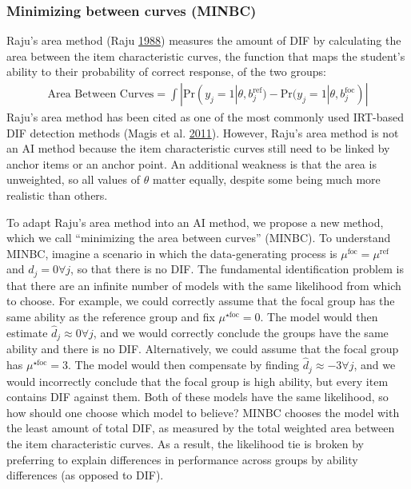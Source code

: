 \documentclass[
  11pt,
]{article}
\begin{document}
\hypertarget{minimizing-between-curves-minbc}{%
\subsubsection{Minimizing between curves (MINBC)}\label{minimizing-between-curves-minbc}}

Raju's area method (Raju \protect\hyperlink{ref-raju1988area}{1988}) measures the amount of DIF by calculating the area between the item characteristic curves, the function that maps the student's ability to their probability of correct response, of the two groups:
\begin{align}
\text{Area Between Curves} = \int |\text{Pr}(y_j = 1| \theta, b_j^{\text{ref}}) - \text{Pr}(y_j = 1| \theta, b_j^{\text{foc}})|
\end{align}
Raju's area method has been cited as one of the most commonly used IRT-based DIF detection methods (Magis et al. \protect\hyperlink{ref-magis2011generalized}{2011}). However, Raju's area method is not an AI method because the item characteristic curves still need to be linked by anchor items or an anchor point. An additional weakness is that the area is unweighted, so all values of \(\theta\) matter equally, despite some being much more realistic than others.

To adapt Raju's area method into an AI method, we propose a new method, which we call \enquote{minimizing the area between curves} (MINBC). To understand MINBC, imagine a scenario in which the data-generating process is \(\mu^{\text{foc}} = \mu^{\text{ref}}\) and \(d_j = 0 \forall j\), so that there is no DIF. The fundamental identification problem is that there are an infinite number of models with the same likelihood from which to choose. For example, we could correctly assume that the focal group has the same ability as the reference group and fix \(\mu^{\star\text{foc}} = 0\). The model would then estimate \(\hat d_j \approx 0 \forall j\), and we would correctly conclude the groups have the same ability and there is no DIF. Alternatively, we could assume that the focal group has \(\mu^{\star\text{foc}} = 3\). The model would then compensate by finding \(\hat d_j \approx -3 \forall j\), and we would incorrectly conclude that the focal group is high ability, but every item contains DIF against them. Both of these models have the same likelihood, so how should one choose which model to believe? MINBC chooses the model with the least amount of total DIF, as measured by the total weighted area between the item characteristic curves. As a result, the likelihood tie is broken by preferring to explain differences in performance across groups by ability differences (as opposed to DIF).
\end{document}
